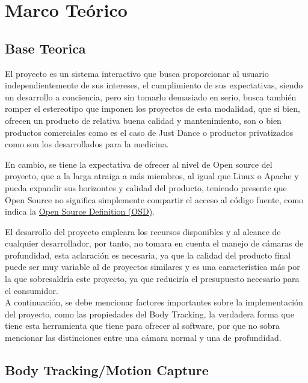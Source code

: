 \chapter{Marco Teórico}

\section{Base Teorica}







El proyecto es un sistema interactivo que busca proporcionar al usuario independientemente de sus intereses, el cumplimiento de sus expectativas, siendo un desarrollo a conciencia, pero sin tomarlo demasiado en serio, busca también romper el estereotipo que imponen los proyectos de esta modalidad, que si bien, ofrecen un producto de relativa buena calidad y mantenimiento, son o bien productos comerciales como es el caso de Just Dance o productos privatizados como son los desarrollados para la medicina. 

En cambio, se tiene la expectativa de ofrecer al nivel de Open source del proyecto, que a la larga atraiga a más miembros, al igual que Linux o Apache y pueda expandir sus horizontes y calidad del producto, teniendo presente que Open Source no significa simplemente compartir el acceso al código fuente, como indica la \href{https://opensource.org/docs/definition.html}{Open Source Definition (OSD)}. 

El desarrollo del proyecto empleara los recursos disponibles y al alcance de cualquier desarrollador, por tanto, no tomara en cuenta el manejo de cámaras de profundidad, esta aclaración es necesaria, ya que la calidad del producto final puede ser muy variable al de proyectos similares y es una característica más por la que sobresaldría este proyecto, ya que reduciría el presupuesto necesario para el consumidor.\\

A continuación, se debe mencionar factores importantes sobre la implementación del proyecto, como las propiedades del Body Tracking, la verdadera forma que tiene esta herramienta que tiene para ofrecer al software, por que no sobra mencionar las distinciones entre una cámara normal y una de profundidad.



\section{Body Tracking/Motion Capture}

